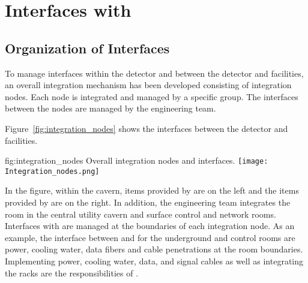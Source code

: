\chapter{Interfaces with }
\label{vl:tc-lbnf}

\section{Organization of Interfaces}
\label{sec:inter-org-interf}
To manage interfaces within the detector and between the
detector and facilities, an overall integration mechanism has been
developed consisting of integration nodes. Each node is integrated
and managed by a specific group. The interfaces between the nodes are
managed by the  engineering team.

Figure~\ref{fig:integration_nodes} shows the interfaces between the
detector and facilities.
\begin{dunefigure}{fig:integration_nodes}
  {Overall integration nodes and interfaces.}
  \texttt{[image: Integration\_nodes.png]}
\end{dunefigure}
In the figure, within the cavern, items provided by  are
on the left and the items provided by  are on the right. In addition, the  engineering team integrates the  room in the central utility
cavern and surface control and network rooms. Interfaces with  are
managed at the boundaries of each integration node. As an example, the
interface between  and  for the underground  and control
rooms are power, cooling water, data fibers and cable penetrations at the
room boundaries. Implementing power, cooling water, data, and
signal cables as well as integrating the racks are the responsibilities of .



